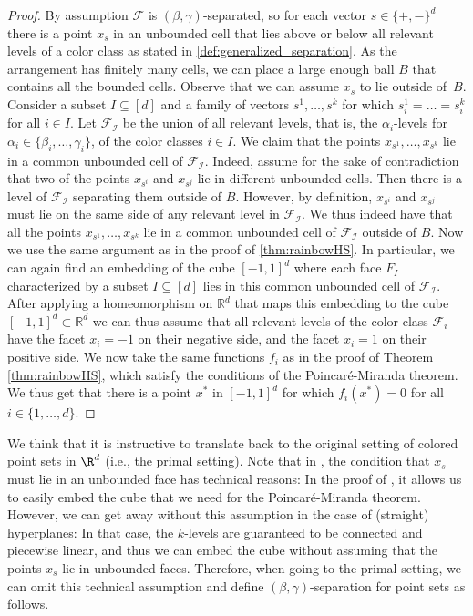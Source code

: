 \begin{proof}
By assumption $\mathcal{F}$ is $(\beta,\gamma)$-separated, so for each vector $s \in \{+, -\}^d$ there is a point $x_s$ in an unbounded cell that lies above or below all relevant levels of a color class as stated in \cref{def:generalized_separation}. As the arrangement has finitely many cells, we can place a large enough ball $B$ that contains all the bounded cells. Observe that we can assume $x_s$ to lie outside of~$B$. Consider a subset $I\subseteq [d]$ and a family of vectors $s^1,\ldots,s^k$ for which $s_i^1=\ldots =s_i^k$ for all $i\in I$. Let $\mathcal{F_{I}}$ be the union of all relevant levels, that is, the $\alpha_i$-levels for $\alpha_i \in \{\beta_i, \ldots, \gamma_i\}$, of the color classes $i \in I$. We claim that the points $x_{s^1},\ldots,x_{s^k}$ lie in a common unbounded cell of $\mathcal{F_{I}}$. Indeed, assume for the sake of contradiction that two of the points $x_{s^i}$ and $x_{s^j}$ lie in different unbounded cells. Then there is a level of $\mathcal{F_{I}}$ separating them outside of $B$. However, by definition, $x_{s^i}$ and $x_{s^j}$ must lie on the same side of any relevant level in $\mathcal{F_{I}}$.
%
We thus indeed have that all the points $x_{s^1},\ldots,x_{s^k}$ lie in a common unbounded cell of $\mathcal{F_{I}}$ outside of $B$. 
Now we use the same argument as in the proof of \cref{thm:rainbowHS}.
In particular, we can again find an embedding of the cube $[-1,1]^d$ where each face $F_I$ characterized by a subset $I \subseteq [d]$ 
lies in this common unbounded cell of $\mathcal{F_{I}}$. After applying a homeomorphism on $\mathbb{R}^d$ that maps this embedding to the cube $[-1,1]^d\subset\mathbb{R}^d$ we can thus assume that all relevant levels of the color class $\mathcal{F}_i$ have the facet $x_i=-1$ on their negative side, and the facet $x_i=1$ on their positive side.
%
We now take the same functions $f_i$ as in the proof of Theorem \ref{thm:rainbowHS}, which satisfy the conditions of the Poincar\'{e}-Miranda theorem.
We thus get that there is a point $x^*$ in $[-1,1]^d$ for which $f_i(x^*)=0$ for all $i\in\{1,\ldots,d\}$.
\end{proof}
%
We think that it is instructive to translate  back to the original setting of colored point sets in $\R^d$ (i.e., the primal setting). Note that in , the condition that $x_s$ must lie in an unbounded face has technical reasons: In the proof of , it allows us to easily embed the cube that we need for the Poincar\'{e}-Miranda theorem. However, we can get away without this assumption in the case of (straight) hyperplanes: In that case, the $k$-levels are guaranteed to be connected and piecewise linear, and thus we can embed the cube without assuming that the points $x_s$ lie in unbounded faces. Therefore, when going to the primal setting, we can omit this technical assumption and define $(\beta, \gamma)$-separation for point sets as follows.
